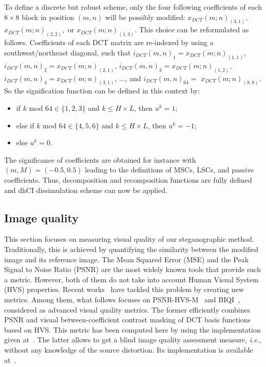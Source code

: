\documentclass{comjnl}
\begin{document}
To define a discrete but robust scheme, only the four following coefficients of each $8 \times 8$ block in position $(m,n)$ will be possibly modified: $x_{DCT}(m;n)_{(3,1)},$ $x_{DCT}(m;n)_{(2,2)},$ or $x_{DCT}(m;n)_{(1,3)}$. 
This choice can be reformulated as follows. 
Coefficients of each DCT matrix are re-indexed by using a southwest/northeast diagonal, such that $i_{DCT}(m,n)_1 = x_{DCT}(m;n)_{(1,1)}$,\linebreak $i_{DCT}(m,n)_2 = x_{DCT}(m;n)_{(2,1)}$, $i_{DCT}(m,n)_3 = x_{DCT}(m;n)_{(1,2)}$, $i_{DCT}(m,n)_4 = x_{DCT}(m;n)_{(3,1)}$, ..., and $i_{DCT}(m,n)_{64} =$  $ x_{DCT}(m;n)_{(8,8)}$.
So the signification function can be defined in this context by:
\begin{itemize}
\item if $k$ mod $64 \in \{1,2,3\}$ and $k\leqslant H\times L$, then $u^k=1$;
\item else if $k$ mod $64 \in \{4, 5, 6\}$ and $k\leqslant H\times L$, then $u^k=-1$;
\item else $u^k = 0$.
\end{itemize}
The significance of coefficients are obtained for instance with 
$(m,M)=(-0.5,0.5)$ leading to the definitions of MSCs, LSCs, and passive coefficients.
Thus, decomposition and recomposition functions are fully defined and dhCI dissimulation scheme can now be applied.




\subsection{Image quality}
This section focuses on measuring visual quality of our steganographic method.
Traditionally, this is achieved by quantifying the similarity 
between the modified image and its reference image.
The Mean Squared Error (MSE) and the Peak Signal to Noise
Ratio (PSNR) are the most widely known tools that provide such a metric.
However, both of them do not take into account Human Visual System (HVS)
properties. 
Recent works~\cite{EAPLBC06,SheikhB06,PSECAL07,MB10} have tackled this problem 
by creating new metrics. Among them, what follows focuses on PSNR-HVS-M~\cite{PSECAL07} and BIQI~\cite{MB10}, considered as advanced visual quality metrics.  
The former efficiently combines PSNR and  visual between-coefficient contrast masking of DCT basis functions based on HVS. This metric has 
been computed here by using the implementation given at~\cite{psnrhvsm11}.
The latter allows to get a blind image quality assessment measure, 
\textit{i.e.}, without any knowledge of the source distortion.
Its implementation is available at~\cite{biqi11}.
\end{document}
